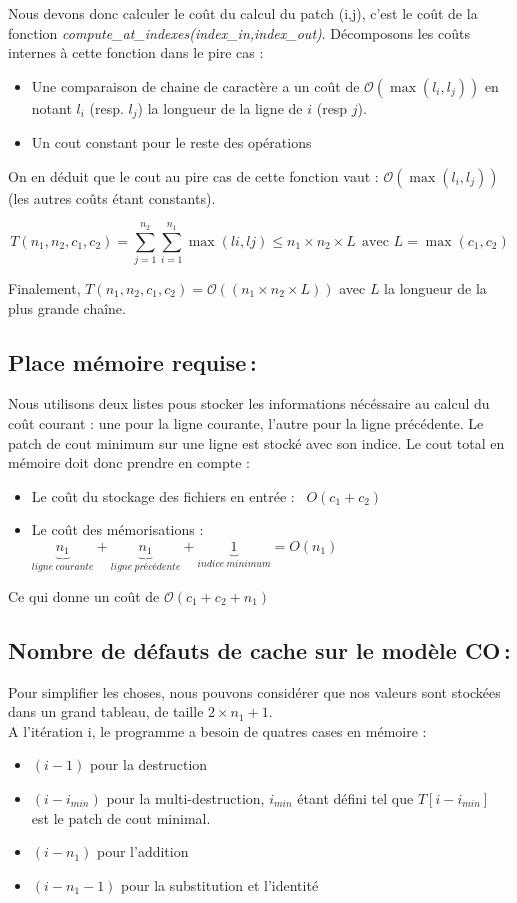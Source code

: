 \documentclass[a4paper, 10pt, french]{article}
\newcommand{\cplx}[1]{\mathcal O \left( #1 \right)}
\begin{document}
	Nous devons donc calculer le coût du calcul du patch (i,j), c'est le coût de la fonction \emph{compute\_at\_indexes(index\_in,index\_out)}.
	Décomposons les coûts internes à cette fonction dans le pire cas :
	\begin{itemize}
	\item Une comparaison de chaine de caractère a un coût de $\cplx{\max(l_i,l_j)}$ en notant $l_i$ (resp. $l_j$) la longueur de la ligne de $i$ (resp $j$).
	\item Un cout constant pour le reste des opérations
	\end{itemize}

	On en déduit que le cout au pire cas de cette fonction vaut : $\cplx{\max(l_i,l_j)}$ (les autres coûts étant constants).

	\[T(n_1,n_2,c_1,c_2) = \sum_{j=1}^{n_2} \sum_{i=1}^{n_1} \max(li,lj) \leq n_1 \times n_2 \times L \ \ \text{avec } L = \max(c_1,c_2)\]

	Finalement, $T(n_1,n_2,c_1,c_2) = \cplx{(n_1 \times n_2 \times L)}$ avec $L$ la longueur de la plus grande chaîne.

  \subsection{Place mémoire requise\,: }
	Nous utilisons deux listes pous stocker les informations nécéssaire au calcul du coût courant : une pour la ligne courante, l'autre pour la ligne
    précédente. Le patch de cout minimum sur une ligne est stocké avec son indice.
    Le cout total en mémoire doit donc prendre en compte :
    \begin{itemize}
    \item Le coût du stockage des fichiers en entrée : \ $O(c_1 + c_2)$
    \item Le coût des mémorisations :  $\underbrace{n_1}_{ligne\ courante} + \underbrace{n_1}_{ligne\ précédente} + \underbrace{1}_{indice \ minimum} = O(n_1)$
    \end{itemize}

    Ce qui donne un coût de $\cplx{c_1 + c_2 + n_1}$

  \subsection{Nombre de défauts de cache sur le modèle CO\,: }
    Pour simplifier les choses, nous pouvons considérer que nos valeurs sont stockées dans un grand tableau, de taille $2 \times n_1 + 1$.\\
    A l'itération i, le programme a besoin de quatres cases en mémoire :
    \begin{itemize}
    \item $(i-1)$ pour la destruction
    \item $(i - i_{min})$ pour la multi-destruction, $i_{min}$ étant défini tel que $T[i-i_{min}]$ est le patch de cout minimal.
    \item $(i - n_1)$ pour l'addition
    \item $(i - n_1 - 1)$ pour la substitution et l'identité
    \end{itemize}
\end{document}
